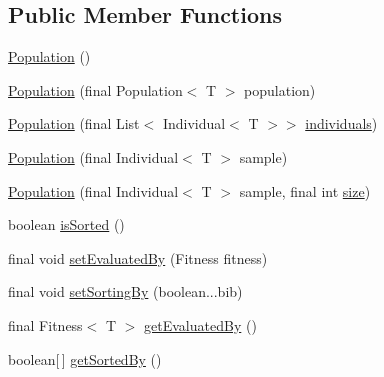 \subsection*{Public Member Functions}
\begin{DoxyCompactItemize}
\item 
\hyperlink{classjenes_1_1population_1_1_population_3_01_t_01extends_01_chromosome_01_4_a0f7b4a9eda8a4dadbc70f8585def56bd}{Population} ()
\item 
\hyperlink{classjenes_1_1population_1_1_population_3_01_t_01extends_01_chromosome_01_4_a30e57f3d2c31bc1c7070557b0d6d4d33}{Population} (final Population$<$ T $>$ population)
\item 
\hyperlink{classjenes_1_1population_1_1_population_3_01_t_01extends_01_chromosome_01_4_a22f453b17c143bdeb4ca7597163e5899}{Population} (final List$<$ Individual$<$ T $>$$>$ \hyperlink{classjenes_1_1population_1_1_population_3_01_t_01extends_01_chromosome_01_4_a3e44ded88c30a8dab6b35fadd986ef47}{individuals})
\item 
\hyperlink{classjenes_1_1population_1_1_population_3_01_t_01extends_01_chromosome_01_4_a0a0c6c3fdf74d042c638022694b47d53}{Population} (final Individual$<$ T $>$ sample)
\item 
\hyperlink{classjenes_1_1population_1_1_population_3_01_t_01extends_01_chromosome_01_4_ae4dc3ffb0550ac33bf726b4c9e531600}{Population} (final Individual$<$ T $>$ sample, final int \hyperlink{classjenes_1_1population_1_1_population_3_01_t_01extends_01_chromosome_01_4_adb9f8282e00932d31fddaa4218c5712e}{size})
\item 
boolean \hyperlink{classjenes_1_1population_1_1_population_3_01_t_01extends_01_chromosome_01_4_a1d0332ff448da8e153fa5f5b17966ccc}{is\-Sorted} ()
\item 
final void \hyperlink{classjenes_1_1population_1_1_population_3_01_t_01extends_01_chromosome_01_4_a569c046ba0bc1905fe60287dd26b5854}{set\-Evaluated\-By} (Fitness fitness)
\item 
final void \hyperlink{classjenes_1_1population_1_1_population_3_01_t_01extends_01_chromosome_01_4_ab0b674564e78c0f005db4aa32ade31ae}{set\-Sorting\-By} (boolean...\-bib)
\item 
final Fitness$<$ T $>$ \hyperlink{classjenes_1_1population_1_1_population_3_01_t_01extends_01_chromosome_01_4_ab50a1d2686fe3733e0fbd094fc91b35e}{get\-Evaluated\-By} ()
\item 
boolean\mbox{[}$\,$\mbox{]} \hyperlink{classjenes_1_1population_1_1_population_3_01_t_01extends_01_chromosome_01_4_a04da91b60ee40df76527c46f6bc47492}{get\-Sorted\-By} ()
$$
\end{DoxyCompactItemize}
